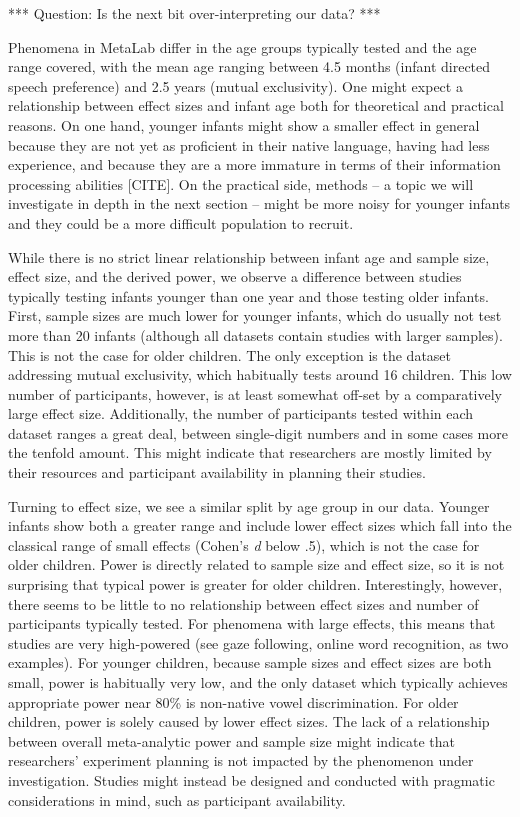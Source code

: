 \documentclass[english,floatsintext,man]{apa6}
\begin{document}
*** Question: Is the next bit over-interpreting our data? ***

Phenomena in MetaLab differ in the age groups typically tested and the
age range covered, with the mean age ranging between 4.5 months (infant
directed speech preference) and 2.5 years (mutual exclusivity). One
might expect a relationship between effect sizes and infant age both for
theoretical and practical reasons. On one hand, younger infants might
show a smaller effect in general because they are not yet as proficient
in their native language, having had less experience, and because they
are a more immature in terms of their information processing abilities
{[}CITE{]}. On the practical side, methods -- a topic we will
investigate in depth in the next section -- might be more noisy for
younger infants and they could be a more difficult population to
recruit.

While there is no strict linear relationship between infant age and
sample size, effect size, and the derived power, we observe a difference
between studies typically testing infants younger than one year and
those testing older infants. First, sample sizes are much lower for
younger infants, which do usually not test more than 20 infants
(although all datasets contain studies with larger samples). This is not
the case for older children. The only exception is the dataset
addressing mutual exclusivity, which habitually tests around 16
children. This low number of participants, however, is at least somewhat
off-set by a comparatively large effect size. Additionally, the number
of participants tested within each dataset ranges a great deal, between
single-digit numbers and in some cases more the tenfold amount. This
might indicate that researchers are mostly limited by their resources
and participant availability in planning their studies.

Turning to effect size, we see a similar split by age group in our data.
Younger infants show both a greater range and include lower effect sizes
which fall into the classical range of small effects (Cohen's \emph{d}
below .5), which is not the case for older children. Power is directly
related to sample size and effect size, so it is not surprising that
typical power is greater for older children. Interestingly, however,
there seems to be little to no relationship between effect sizes and
number of participants typically tested. For phenomena with large
effects, this means that studies are very high-powered (see gaze
following, online word recognition, as two examples). For younger
children, because sample sizes and effect sizes are both small, power is
habitually very low, and the only dataset which typically achieves
appropriate power near 80\% is non-native vowel discrimination. For
older children, power is solely caused by lower effect sizes. The lack
of a relationship between overall meta-analytic power and sample size
might indicate that researchers' experiment planning is not impacted by
the phenomenon under investigation. Studies might instead be designed
and conducted with pragmatic considerations in mind, such as participant
availability.
\end{document}
